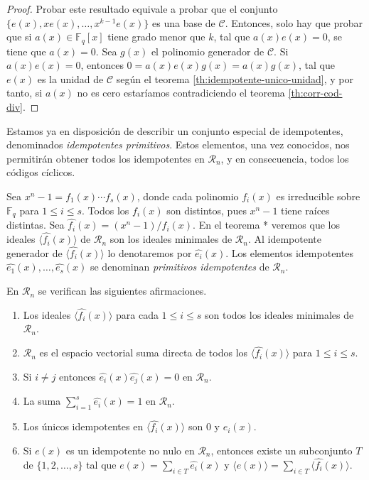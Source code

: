 \begin{proof}
  Probar este resultado equivale a probar que el conjunto \(\{e(x), xe(x), \dots, x^{k-1}e(x)\}\) es una base de \(\mathcal C\).
  Entonces, solo hay que probar que si \(a(x) \in \mathbb F_q[x]\) tiene grado menor que \(k\), tal que \(a(x)e(x) = 0\), se tiene que \(a(x) = 0\).
  Sea \(g(x)\) el polinomio generador de \(\mathcal C\).
  Si \(a(x)e(x) = 0\), entonces \(0 = a(x)e(x)g(x) = a(x)g(x)\), tal que \(e(x)\) es la unidad de \(\mathcal C\) según el teorema \ref{th:idempotente-unico-unidad}, y por tanto, si \(a(x)\) no es cero estaríamos contradiciendo el teorema \ref{th:corr-cod-div}.
\end{proof}


Estamos ya en disposición de describir un conjunto especial de idempotentes, denominados \textit{idempotentes primitivos}.
Estos elementos, una vez conocidos, nos permitirán obtener todos los idempotentes en \(\mathcal R_n\), y en consecuencia, todos los códigos cíclicos.

Sea \(x^n - 1 = f_1(x)\cdots f_s(x)\), donde cada polinomio \(f_i(x)\) es irreducible sobre \(\mathbb F_q\) para \(1 \leq i \leq s\).
Todos los \(f_i(x)\) son distintos, pues \(x^n - 1\) tiene raíces distintas.
Sea \(\widehat{f_i}(x) = (x^n - 1)/f_i(x)\).
En el teorema * veremos que los ideales \(\langle \widehat{f_i}(x)\rangle\) de \(\mathcal R_n\) son los ideales minimales de \(\mathcal R_n\).
Al idempotente generador de \(\langle \widehat{f_i}(x)\rangle\) lo denotaremos por \(\widehat{e_i}(x)\).
Los elementos idempotentes \(\widehat{e_1}(x), \dots, \widehat{e_s}(x)\) se denominan \textit{primitivos idempotentes} de \(\mathcal R_n\).

\begin{theorem}
  En \(\mathcal R_n\) se verifican las siguientes afirmaciones.
  \begin{enumerate}
    \item Los ideales \(\langle \widehat{f_i}(x)\rangle\) para cada \(1 \leq i \leq s\) son todos los ideales minimales de \(\mathcal R_n\).
    \item \(\mathcal R_n\) es el espacio vectorial suma directa de todos los \(\langle \widehat{f_i}(x)\rangle\) para \(1 \leq i \leq s\).
    \item Si \(i \neq j\) entonces \(\widehat{e_i}(x)\widehat{e_j}(x) = 0\) en \(\mathcal R_n\).
    \item La suma \(\sum_{i=1}^s \widehat{e_i}(x) = 1\) en \(\mathcal R_n\).
    \item Los únicos idempotentes en \(\langle \widehat{f_i}(x)\rangle\) son \(0\) y \(\widehat{e_i}(x)\).
    \item Si \(e(x)\) es un idempotente no nulo en \(\mathcal R_n\), entonces existe un subconjunto \(T\) de \(\{1, 2, \dots, s\}\) tal que \(e(x) = \sum_{i \in T}\widehat{e_i}(x)\) y \(\langle e(x) \rangle = \sum_{i \in T}\langle \widehat{f_i}(x)\rangle\).
  \end{enumerate}
\end{theorem}


